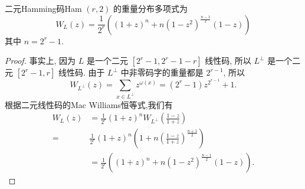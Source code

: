 \begin{corollary}
二元Hamming码Ham $ (r, 2) $ 的重量分布多项式为
$$
W_{L}(z)=\frac{1}{2^{r}}\left((1+z)^{n}+n\left(1-z^{2}\right)^{\frac{n-1}{2}}(1-z)\right)
$$
其中 $ n=2^{r}-1 $.
\end{corollary}
\begin{proof}
    事实上, 因为 $ L $ 是一个二元 $ \left[2^{r}-1,2^{r}-1-r\right] $ 线性码, 所以 $ L^{\perp} $ 是一个二元 $ \left[2^{r}-1, r\right] $ 线性码. 由于 $ L^{\perp} $ 中非零码字的重量都是 $ 2^{r-1} $, 所以
$$
W_{L^{\perp}}(z)=\sum_{x \in L^{\perp}} z^{\omega(x)}=\left(2^{r}-1\right) z^{2^{r-1}}+1 .
$$
根据二元线性码的Mac Williams恒等式,我们有
$$
\begin{aligned}
W_{L}(z) & =\frac{1}{2^{r}}(1+z)^{n} W_{L^{\perp}}\left(\frac{1-z}{1+z}\right) \\
= & \frac{1}{2^{r}}(1+z)^{n}\left(1+n\left(\frac{1-z}{1+z}\right)^{\frac{n+1}{2}}\right)\\
&=\frac{1}{2^{r}}\left((1+z)^{n}+n\left(1-z^{2}\right)^{\frac{n-1}{2}}(1-z)\right) .
\end{aligned}
$$
\end{proof}

